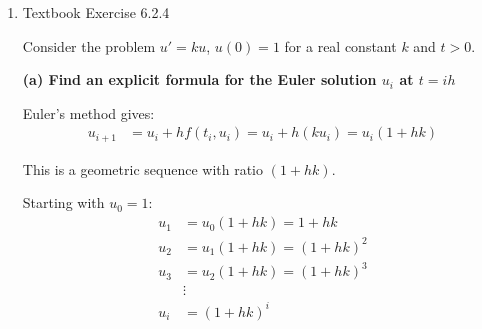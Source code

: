 \documentclass[reqno, answers]{exam}
\begin{document}
\begin{enumerate}
\begin{solution}
          \textit{Alternative verification:} We can also verify consistency by checking that the local truncation error is $O(h)$.

          Let $u(t)$ be the exact solution satisfying $u'(t) = f(t, u(t))$. The local truncation error is:
          \begin{align*}
            \tau_i & = \frac{u(t_{i+1}) - u(t_i)}{h} - \phi(t_i, u(t_i), h)                  \\
                   & = \frac{u(t_i + h) - u(t_i)}{h} - f(t_i + h, u(t_i) + h f(t_i, u(t_i)))
          \end{align*}

          Using Taylor expansion: $u(t_i + h) = u(t_i) + h u'(t_i) + O(h^2) = u(t_i) + h f(t_i, u(t_i)) + O(h^2)$

          And: $f(t_i + h, u(t_i) + h f(t_i, u(t_i))) = f(t_i, u(t_i)) + O(h)$

          Thus:
          \begin{align*}
            \tau_i & = \frac{u(t_i) + h f(t_i, u(t_i)) + O(h^2) - u(t_i)}{h} - f(t_i, u(t_i)) - O(h) \\
                   & = f(t_i, u(t_i)) + O(h) - f(t_i, u(t_i)) - O(h)                                 \\
                   & = O(h)
          \end{align*}

          Since $\tau_i \to 0$ as $h \to 0$, the method is consistent.
        \end{solution}


  \item Textbook Exercise 6.2.4
        \begin{solution}
          Consider the problem $u' = ku$, $u(0) = 1$ for a real constant $k$ and $t > 0$.

          \medskip

          \textbf{(a) Find an explicit formula for the Euler solution $u_i$ at $t = ih$}

          Euler's method gives:
          \begin{align*}
            u_{i+1} & = u_i + h f(t_i, u_i) = u_i + h(ku_i) = u_i(1 + hk)
          \end{align*}

          This is a geometric sequence with ratio $(1 + hk)$.

          Starting with $u_0 = 1$:
          \begin{align*}
            u_1 & = u_0(1 + hk) = 1 + hk     \\
            u_2 & = u_1(1 + hk) = (1 + hk)^2 \\
            u_3 & = u_2(1 + hk) = (1 + hk)^3 \\
                & \vdots                     \\
            u_i & = (1 + hk)^i
          \end{align*}


\end{solution}
\end{enumerate}
\end{document}
